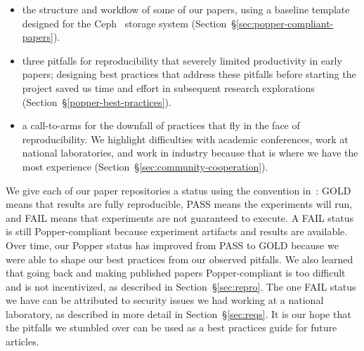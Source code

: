 \begin{itemize}

  \item the structure and workflow of some of our papers,
using a baseline template designed for the Ceph~\cite{weil:osdi2006-ceph}
storage system (Section~\S\ref{sec:popper-compliant-papers}).

  \item three pitfalls for reproducibility that severely limited
productivity in early papers; designing best practices that address these
pitfalls before starting the project saved us time and effort in subsequent
research explorations (Section~\S\ref{popper-best-practices}).

  \item a call-to-arms for the downfall of practices that fly in the face of
reproducibility. We highlight difficulties with academic conferences, work at
national laboratories, and work in industry because that is where we have the
most experience (Section~\S\ref{sec:community-cooperation}).

\end{itemize}

We give each of our paper repositories a status using the convention
in~\cite{jimenez:rr18-popper}: GOLD means that results are fully reproducible,
PASS means the experiments will run, and FAIL means that experiments are not
guaranteed to execute. A FAIL status is still Popper-compliant because
experiment artifacts and results are available.  Over time, our Popper status
has improved from PASS to GOLD because we were able to shape our best practices
from our observed pitfalls. We also learned that going back and making
published papers Popper-compliant is too difficult and is not incentivized, as
described in Section~\S\ref{sec:repro}. The one FAIL status we have can be
attributed to security issues we had working at a national laboratory, as
described in more detail in Section~\S\ref{sec:reqs}. It is our hope that the
pitfalls we stumbled over can be used as a best practices guide for future
articles.

